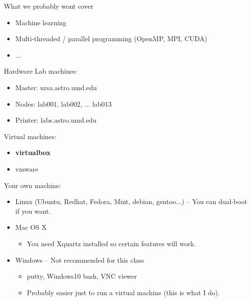 \documentclass[10pt]{beamer}
\begin{document}
\begin{frame}[fragile]{What we probably wont cover}

	\begin{itemize}
		\item Machine learning
		\item Multi-threaded / parallel programming (OpenMP, MPI, CUDA)
		\item ...
	\end{itemize}

\end{frame}

\begin{frame}[fragile]{Hardware}
	Lab machines:
	\begin{itemize}
		\item Master: ursa.astro.umd.edu
		\item Nodes: lab001, lab002, ... lab013
		\item Printer: labs.astro.umd.edu
	\end{itemize}


	Virtual machines:
	\begin{itemize}
		\item \textbf{virtualbox}
		\item vmware
	\end{itemize}

	Your own machine:
	\begin{itemize}
		\item Linux (Ubuntu, Redhat, Fedora, Mint, debian, gentoo...) -- 	You can dual-boot if you want. 
		\item Mac OS X
		\begin{itemize}
			\item You need Xquartz installed so certain features will work. 
		\end{itemize}
		\item Windows -- Not recommended for this class
		\begin{itemize}
			\item putty, Windows10 bash, VNC viewer
			\item Probably easier just to run a virtual machine (this is what I do). 
		\end{itemize}
	\end{itemize}

\end{frame}
\end{document}
